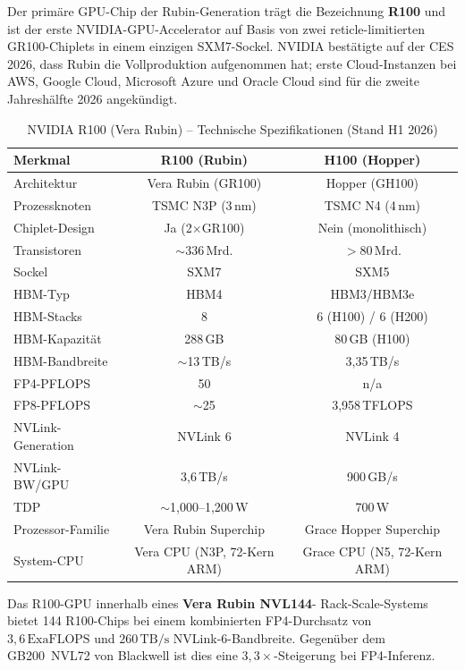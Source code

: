 ﻿\documentclass[12pt,a4paper]{article}
\begin{document}
Der primäre GPU-Chip der Rubin-Generation trägt die Bezeichnung
\textbf{R100} und ist der erste NVIDIA-GPU-Accelerator auf
Basis von zwei reticle-limitierten GR100-Chiplets in einem
einzigen SXM7-Sockel. NVIDIA bestätigte auf der CES 2026,
dass Rubin die Vollproduktion aufgenommen hat; erste
Cloud-Instanzen bei AWS, Google Cloud, Microsoft Azure und
Oracle Cloud sind für die zweite Jahreshälfte 2026 angekündigt.

\begin{table}[ht]
\centering
\small
\caption{NVIDIA R100 (Vera Rubin) -- Technische Spezifikationen (Stand H1 2026)}
\label{tab:r100_specs}
\begin{tabular}{@{}lcc@{}}
\toprule
\textbf{Merkmal} & \textbf{R100 (Rubin)} & \textbf{H100 (Hopper)} \\
\midrule
Architektur & Vera Rubin (GR100) & Hopper (GH100) \\
Prozessknoten & TSMC N3P (3\,nm) & TSMC N4 (4\,nm) \\
Chiplet-Design & Ja (2$\times$GR100) & Nein (monolithisch) \\
Transistoren & $\sim$336\,Mrd. & $>80\,\text{Mrd.}$ \\
Sockel & SXM7 & SXM5 \\
HBM-Typ & HBM4 & HBM3/HBM3e \\
HBM-Stacks & 8 & 6 (H100) / 6 (H200) \\
HBM-Kapazität & 288\,GB & 80\,GB (H100) \\
HBM-Bandbreite & $\sim$13\,TB/s & 3,35\,TB/s \\
FP4-PFLOPS & 50 & n/a \\
FP8-PFLOPS & $\sim$25 & 3,958\,TFLOPS \\
NVLink-Generation & NVLink 6 & NVLink 4 \\
NVLink-BW/GPU & 3,6\,TB/s & 900\,GB/s \\
TDP & $\sim$1{,}000--1{,}200\,W & 700\,W \\
Prozessor-Familie & Vera Rubin Superchip & Grace Hopper Superchip \\
System-CPU & Vera CPU (N3P, 72-Kern ARM) & Grace CPU (N5, 72-Kern ARM) \\
\bottomrule
\end{tabular}
\end{table}

\noindent Das R100-GPU innerhalb eines \textbf{Vera Rubin NVL144}-
Rack-Scale-Systems bietet 144 R100-Chips bei einem kombinierten
FP4-Durchsatz von $3{,}6\,\text{ExaFLOPS}$ und $260\,\text{TB/s}$
NVLink-6-Bandbreite. Gegenüber dem GB200~NVL72 von Blackwell
ist dies eine $3{,}3\times$-Steigerung bei FP4-Inferenz.
\end{document}
